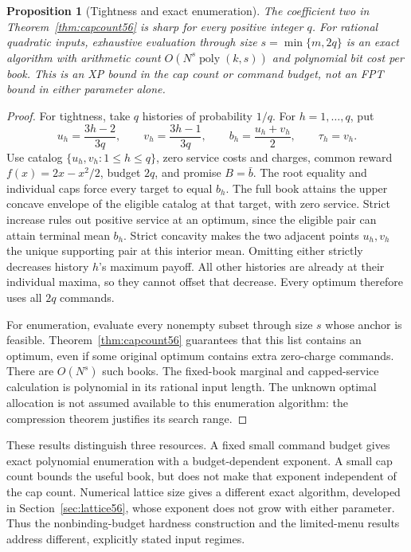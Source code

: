 \documentclass[11pt,letterpaper]{article}
\newtheorem{proposition}[theorem]{Proposition}
\theoremstyle{definition}\newtheorem{remark}[theorem]{Remark}
\begin{document}
\begin{proposition}[Tightness and exact enumeration]\label{prop:tight56}
The coefficient two in Theorem~\ref{thm:capcount56} is sharp for every positive integer $q$. For rational quadratic inputs, exhaustive evaluation through size $s=\min\{m,2q\}$ is an exact algorithm with arithmetic count $O(N^s\operatorname{poly}(k,s))$ and polynomial bit cost per book. This is an XP bound in the cap count or command budget, not an FPT bound in either parameter alone.
\end{proposition}
\begin{proof}
For tightness, take $q$ histories of probability $1/q$. For $h=1,\ldots,q$, put
\[
 u_h=\frac{3h-2}{3q},\qquad v_h=\frac{3h-1}{3q},\qquad
 b_h=\frac{u_h+v_h}{2},\qquad \tau_h=v_h.
\]
Use catalog $\{u_h,v_h:1\leq h\leq q\}$, zero service costs and charges, common reward $f(x)=2x-x^2/2$, budget $2q$, and promise $B=\bar b$. The root equality and individual caps force every target to equal $b_h$. The full book attains the upper concave envelope of the eligible catalog at that target, with zero service. Strict increase rules out positive service at an optimum, since the eligible pair can attain terminal mean $b_h$. Strict concavity makes the two adjacent points $u_h,v_h$ the unique supporting pair at this interior mean. Omitting either strictly decreases history $h$'s maximum payoff. All other histories are already at their individual maxima, so they cannot offset that decrease. Every optimum therefore uses all $2q$ commands.

For enumeration, evaluate every nonempty subset through size $s$ whose anchor is feasible. Theorem~\ref{thm:capcount56} guarantees that this list contains an optimum, even if some original optimum contains extra zero-charge commands. There are $O(N^s)$ such books. The fixed-book marginal and capped-service calculation is polynomial in its rational input length. The unknown optimal allocation is not assumed available to this enumeration algorithm: the compression theorem justifies its search range.
\end{proof}

These results distinguish three resources. A fixed small command budget gives exact polynomial enumeration with a budget-dependent exponent. A small cap count bounds the useful book, but does not make that exponent independent of the cap count. Numerical lattice size gives a different exact algorithm, developed in Section~\ref{sec:lattice56}, whose exponent does not grow with either parameter. Thus the nonbinding-budget hardness construction and the limited-menu results address different, explicitly stated input regimes.
\end{document}
